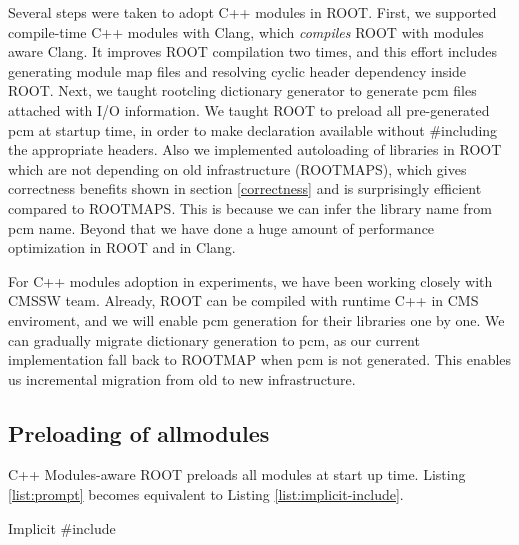 \documentclass{webofc}
\begin{document}
Several steps were taken to adopt C++ modules in ROOT. First, we supported compile-time C++ modules with Clang, which {\it compiles} ROOT with modules aware Clang. It improves ROOT compilation two times, and this effort includes generating module map files and resolving cyclic header dependency inside ROOT. Next, we taught rootcling dictionary generator to generate pcm files attached with I/O information. We taught ROOT to preload all pre-generated pcm at startup time, in order to make declaration available without \#including the appropriate headers. Also we implemented autoloading of libraries in ROOT which are not depending on old infrastructure (ROOTMAPS), which gives correctness benefits shown in section \ref{correctness} and is surprisingly efficient compared to ROOTMAPS. This is because we can infer the library name from pcm name. Beyond that we have done a huge amount of performance optimization in ROOT and in Clang.

For C++ modules adoption in experiments, we have been working closely with CMSSW team. Already, ROOT can be compiled with runtime C++ in CMS enviroment, and we will enable pcm generation for their libraries one by one. We can gradually migrate dictionary generation to pcm, as our current implementation fall back to ROOTMAP when pcm is not generated. This enables us incremental migration from old to new infrastructure.

\subsection{Preloading of allmodules}
\label{subsec:preloading}

C++ Modules-aware ROOT preloads all modules at start up time. Listing \ref{list:prompt} becomes equivalent to Listing \ref{list:implicit-include}.

\begin{listing}[h]
    \noindent
    \begin{minipage}[h]{.7\textwidth}
    \end{minipage}
    \caption{Implicit \#include}
    \label{list:implicit-include}
\end{listing}
\end{document}
